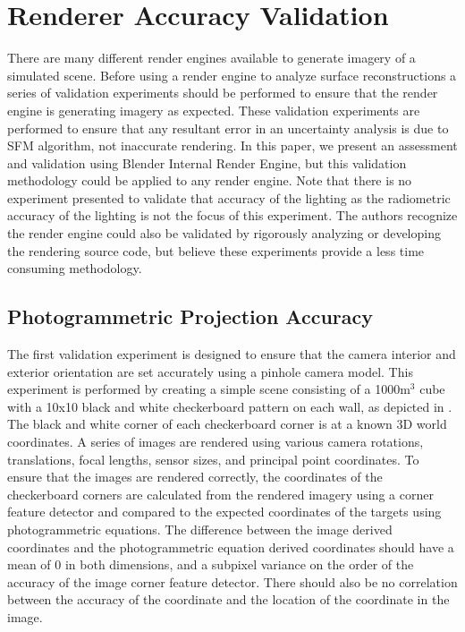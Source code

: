 \section{Renderer Accuracy Validation}

There are many different render engines available to generate imagery of a simulated scene.  Before using a render engine to analyze surface reconstructions a series of validation experiments should be performed to ensure that the render engine is generating imagery as expected.  These validation experiments are performed to ensure that any resultant error in an uncertainty analysis is due to SFM algorithm, not inaccurate rendering.  In this paper, we present an assessment and validation using Blender Internal Render Engine, but this validation methodology could be applied to any render engine.  Note that there is no experiment presented to validate that accuracy of the lighting as the radiometric accuracy of the lighting is not the focus of this experiment.  The authors recognize the render engine could also be validated by rigorously analyzing or developing the rendering source code, but believe these experiments provide a less time consuming methodology.

\subsection{Photogrammetric Projection Accuracy}
The first validation experiment is designed to ensure that the camera interior and exterior orientation are set accurately using a pinhole camera model.  This experiment is performed by creating a simple scene consisting of a 1000m$^3$ cube with a 10x10 black and white checkerboard pattern on each wall, as depicted in .   The black and white corner of each checkerboard corner is at a known 3D world coordinates.  A series of images are rendered using various camera rotations, translations, focal lengths, sensor sizes, and principal point coordinates.  To ensure that the images are rendered correctly, the coordinates of the checkerboard corners are calculated from the rendered imagery using a corner feature detector and compared to the expected coordinates of the targets using photogrammetric equations.  The difference between the image derived coordinates and the photogrammetric equation derived coordinates should have a mean of 0 in both dimensions, and a subpixel variance on the order of the accuracy of the image corner feature detector.  There should also be no correlation between the accuracy of the coordinate and the location of the coordinate in the image.

